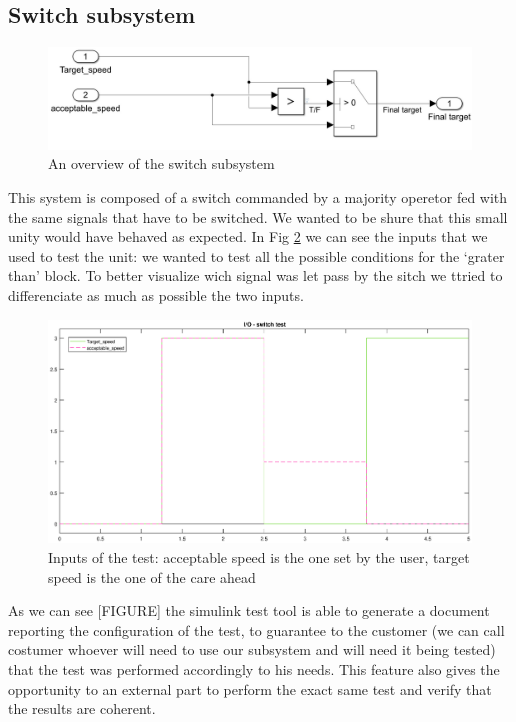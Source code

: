 \documentclass[12pt,a4paper]{report}
\begin{document}
\subsection{Switch subsystem}
\begin{figure}[!h]
	\centering
	\includegraphics[scale=0.34]{switch_subs.jpg}
	\caption{An overview of the switch subsystem}
	\label{switch_subs}
\end{figure}
\FloatBarrier
This system is composed of a switch commanded by a majority operetor fed with the same signals that have to be switched. We wanted to be shure that this small unity would have behaved as expected. 
In Fig \ref{IO_baseline_switch_detach} we can see the inputs that we used to test the unit: we wanted to test all the possible conditions for the ‘grater than’ block. To better visualize wich signal was let pass by the sitch we ttried to differenciate as much as possible the two inputs.
\begin{figure}[!h]
	\centering
	\includegraphics[scale=0.4]{IO_baseline_switch_detach.eps}
	\caption{Inputs of the test: acceptable speed is the one set by the user, target speed is the one of the care ahead}
	\label{IO_baseline_switch_detach}
\end{figure}
As we can see [FIGURE] the simulink test tool is able to generate a document reporting the configuration of the test, to guarantee to the customer (we can call costumer whoever will need to use our subsystem and will need it being tested) that the test was performed accordingly to his needs. This feature also gives the opportunity to an external part to perform the exact same test and verify that the results are coherent.
\end{document}
